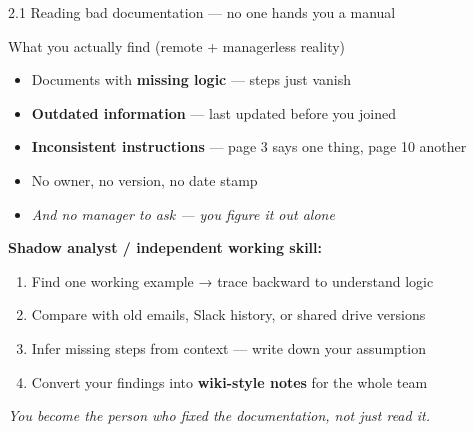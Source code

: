 \documentclass[aspectratio=169, 11pt]{beamer}
\begin{document}
	\begin{frame}{2.1 Reading bad documentation — no one hands you a manual}
		\begin{block}{What you actually find (remote + managerless reality)}
			\begin{itemize}
				\item Documents with \textbf{missing logic} — steps just vanish
				\item \textbf{Outdated information} — last updated before you joined
				\item \textbf{Inconsistent instructions} — page 3 says one thing, page 10 another
				\item No owner, no version, no date stamp
				\item \textit{And no manager to ask — you figure it out alone}
			\end{itemize}
		\end{block}
		\vspace{0.1cm}
		\alert{\textbf{Shadow analyst / independent working skill:}}
		\begin{enumerate}
			\item Find one working example → trace backward to understand logic
			\item Compare with old emails, Slack history, or shared drive versions
			\item Infer missing steps from context — write down your assumption
			\item Convert your findings into \textbf{wiki-style notes} for the whole team
		\end{enumerate}
		\textit{You become the person who fixed the documentation, not just read it.}
	\end{frame}
	
\end{document}
